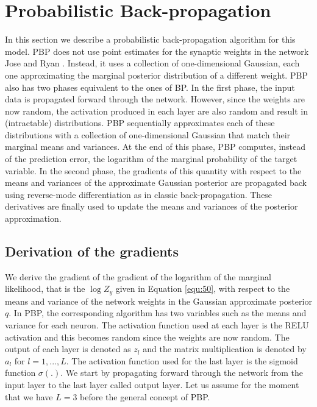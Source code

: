 \documentclass[]{article}
\begin{document}
\section{Probabilistic Back-propagation}
In this section we describe a probabilistic back-propagation algorithm for this model. PBP does not use point estimates for the synaptic weights in the network Jose and Ryan \cite{jose2015propagation}. Instead, it uses a collection of one-dimensional Gaussian, each one approximating the marginal posterior distribution of a different weight. PBP also has two phases equivalent to the ones of BP. In the first phase, the input data is propagated forward through the network. However, since the weights are now random, the activation produced in each layer are also random and result in (intractable) distributions. PBP sequentially approximates each of these distributions with a collection of one-dimensional Gaussian that match their marginal means and variances. At the end of this phase, PBP computes, instead of the prediction error, the logarithm of the marginal probability of the target variable. In the second phase, the gradients of this quantity with respect to the means and variances of the approximate Gaussian posterior are propagated back using reverse-mode differentiation as in classic back-propagation. These derivatives are finally used to update the means and variances of the posterior approximation.
\subsection{Derivation of the gradients}
We derive the gradient of the gradient of the logarithm of the marginal likelihood, that is the $\log Z_y$ given in Equation \ref{equ:50}, with respect to the means and variance of the network weights in the Gaussian approximate posterior $q$. In PBP, the corresponding algorithm has two variables such as the means and variance for each neuron. The activation function used at each layer is the RELU activation and this becomes random since the weights are now random. The output of each layer is denoted as $z_l$ and the matrix multiplication is denoted by $a_l$ for $l = 1,...,L$. The activation function used for the last layer is the sigmoid function $\sigma(.)$. We start by propagating forward through the network from the input layer to the last layer called output layer. Let us assume for the moment that we have $L = 3$ before the general concept of PBP. 
\end{document}
